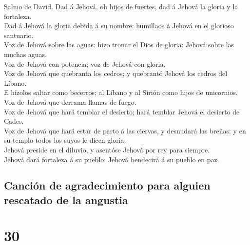  Salmo de David. Dad á Jehová, oh hijos de fuertes, dad á
Jehová la gloria y la fortaleza.\\
 Dad á Jehová la gloria debida á su nombre: humillaos á
Jehová en el glorioso santuario.\\
 Voz de Jehová sobre las aguas: hizo tronar el Dios de
gloria: Jehová sobre las muchas aguas.\\
 Voz de Jehová con potencia; voz de Jehová con gloria.\\
 Voz de Jehová que quebranta los cedros; y quebrantó
Jehová los cedros del Líbano.\\
 E hízolos saltar como becerros; al Líbano y al Sirión
como hijos de unicornios.\\
 Voz de Jehová que derrama llamas de fuego.\\
 Voz de Jehová que hará temblar el desierto; hará temblar
Jehová el desierto de Cades.\\
 Voz de Jehová que hará estar de parto á las ciervas, y
desnudará las breñas: y en su templo todos los suyos le dicen gloria.\\
 Jehová preside en el diluvio, y asentóse Jehová por rey
para siempre.\\
 Jehová dará fortaleza á su pueblo: Jehová bendecirá á su
pueblo en paz.

\hypertarget{canciuxf3n-de-agradecimiento-para-alguien-rescatado-de-la-angustia}{%
\subsection{Canción de agradecimiento para alguien rescatado de la
angustia}\label{canciuxf3n-de-agradecimiento-para-alguien-rescatado-de-la-angustia}}

\hypertarget{section-29}{%
\section{30}\label{section-29}}

